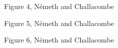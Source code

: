 \documentclass[prl,twocolumn,showpacs,twocolumngrid,superbib]{revtex4}
\begin{document}
{\begin{center}
Figure 4, N{\'e}meth and Challacombe \\[1.cm]
\end{center}

\clearpage

\begin{center}
Figure 5, N{\'e}meth and Challacombe \\[1.cm]
\end{center}

\clearpage

\begin{center}
Figure 6, N{\'e}meth and Challacombe \\[1.cm]
\end{center}

}
\end{document}
